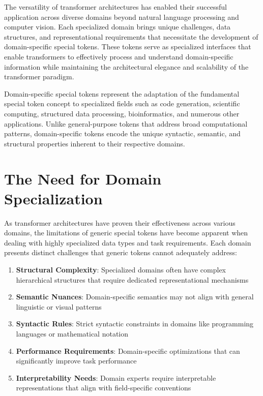 
The versatility of transformer architectures has enabled their successful application across diverse domains beyond natural language processing and computer vision. Each specialized domain brings unique challenges, data structures, and representational requirements that necessitate the development of domain-specific special tokens. These tokens serve as specialized interfaces that enable transformers to effectively process and understand domain-specific information while maintaining the architectural elegance and scalability of the transformer paradigm.

Domain-specific special tokens represent the adaptation of the fundamental special token concept to specialized fields such as code generation, scientific computing, structured data processing, bioinformatics, and numerous other applications. Unlike general-purpose tokens that address broad computational patterns, domain-specific tokens encode the unique syntactic, semantic, and structural properties inherent to their respective domains.

\section{The Need for Domain Specialization}

As transformer architectures have proven their effectiveness across various domains, the limitations of generic special tokens have become apparent when dealing with highly specialized data types and task requirements. Each domain presents distinct challenges that generic tokens cannot adequately address:

\begin{enumerate}
\item \textbf{Structural Complexity}: Specialized domains often have complex hierarchical structures that require dedicated representational mechanisms
\item \textbf{Semantic Nuances}: Domain-specific semantics may not align with general linguistic or visual patterns
\item \textbf{Syntactic Rules}: Strict syntactic constraints in domains like programming languages or mathematical notation
\item \textbf{Performance Requirements}: Domain-specific optimizations that can significantly improve task performance
\item \textbf{Interpretability Needs}: Domain experts require interpretable representations that align with field-specific conventions
\end{enumerate}

